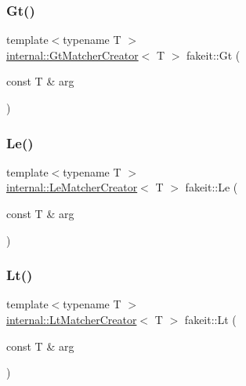 \mbox{\label{namespacefakeit_a319a253682ec7c12cba048db91165f2f}} 
\subsubsection{\texorpdfstring{Gt()}{Gt()}}
{\footnotesize\ttfamily template$<$typename T $>$ \\
\mbox{\hyperlink{structfakeit_1_1internal_1_1GtMatcherCreator}{internal\+::\+Gt\+Matcher\+Creator}}$<$ T $>$ fakeit\+::\+Gt (\begin{DoxyParamCaption}\item[{const T \&}]{arg }\end{DoxyParamCaption})}

\mbox{\label{namespacefakeit_aaff188e990bef765c3cf3efb75a6cc87}} 
\subsubsection{\texorpdfstring{Le()}{Le()}}
{\footnotesize\ttfamily template$<$typename T $>$ \\
\mbox{\hyperlink{structfakeit_1_1internal_1_1LeMatcherCreator}{internal\+::\+Le\+Matcher\+Creator}}$<$ T $>$ fakeit\+::\+Le (\begin{DoxyParamCaption}\item[{const T \&}]{arg }\end{DoxyParamCaption})}

\mbox{\label{namespacefakeit_ac8b609e3becf3127728c58dd79ef38bf}} 
\subsubsection{\texorpdfstring{Lt()}{Lt()}}
{\footnotesize\ttfamily template$<$typename T $>$ \\
\mbox{\hyperlink{structfakeit_1_1internal_1_1LtMatcherCreator}{internal\+::\+Lt\+Matcher\+Creator}}$<$ T $>$ fakeit\+::\+Lt (\begin{DoxyParamCaption}\item[{const T \&}]{arg }\end{DoxyParamCaption})}

\mbox{\label{namespacefakeit_a2c933a0085ac3121fbfe637ace08a7bb}} 
